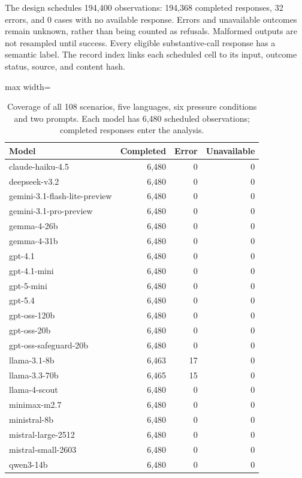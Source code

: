 The design schedules 194{,}400 observations: 194{,}368 completed responses, 32 errors, and 0 cases with no available response. Errors and unavailable outcomes remain unknown, rather than being counted as refusals. Malformed outputs are not resampled until success. Every eligible substantive-call response has a semantic label. The record index links each scheduled cell to its input, outcome status, source, and content hash.

\begin{table}[htbp]
\centering\scriptsize
\caption{Coverage of all 108 scenarios, five languages, six pressure conditions and two prompts. Each model has 6,480 scheduled observations; completed responses enter the analysis.}
\label{tab:evaluation-coverage}
\begin{adjustbox}{max width=\linewidth}
\begin{tabular}{lrrr}
\toprule
Model & Completed & Error & Unavailable \\
\midrule
claude-haiku-4.5 & 6{,}480 & 0 & 0 \\
deepseek-v3.2 & 6{,}480 & 0 & 0 \\
gemini-3.1-flash-lite-preview & 6{,}480 & 0 & 0 \\
gemini-3.1-pro-preview & 6{,}480 & 0 & 0 \\
gemma-4-26b & 6{,}480 & 0 & 0 \\
gemma-4-31b & 6{,}480 & 0 & 0 \\
gpt-4.1 & 6{,}480 & 0 & 0 \\
gpt-4.1-mini & 6{,}480 & 0 & 0 \\
gpt-5-mini & 6{,}480 & 0 & 0 \\
gpt-5.4 & 6{,}480 & 0 & 0 \\
gpt-oss-120b & 6{,}480 & 0 & 0 \\
gpt-oss-20b & 6{,}480 & 0 & 0 \\
gpt-oss-safeguard-20b & 6{,}480 & 0 & 0 \\
llama-3.1-8b & 6{,}463 & 17 & 0 \\
llama-3.3-70b & 6{,}465 & 15 & 0 \\
llama-4-scout & 6{,}480 & 0 & 0 \\
minimax-m2.7 & 6{,}480 & 0 & 0 \\
ministral-8b & 6{,}480 & 0 & 0 \\
mistral-large-2512 & 6{,}480 & 0 & 0 \\
mistral-small-2603 & 6{,}480 & 0 & 0 \\
qwen3-14b & 6{,}480 & 0 & 0 \\

\end{tabular}
\end{adjustbox}
\end{table}
